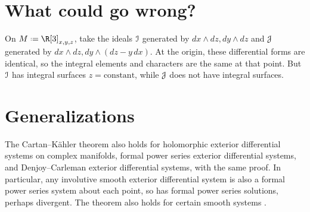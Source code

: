 \section{What could go wrong?}
\begin{example}
On \(M\defeq\R[3]_{x,y,z}\), take the ideals \(\mathcal{I}\) generated by \(dx\wedge dz, dy\wedge dz\) and \(\mathcal{J}\) generated by \(dx\wedge dz, dy\wedge(dz-y \, dx)\).
At the origin, these differential forms are identical, so the integral elements and characters are the same at that point.
But \(\mathcal{I}\) has integral surfaces \(z=\text{constant}\), while \(\mathcal{J}\) does not have integral surfaces.
\end{example}

\section{Generalizations}
The Cartan--K\"ahler theorem also holds for holomorphic exterior differential systems on complex manifolds, formal power series exterior differential systems, and Denjoy--Carleman exterior differential systems, with the same proof.
In particular, any involutive smooth exterior differential system is also a formal power series system about each point, so has formal power series solutions,  perhaps divergent.
The theorem also holds for certain smooth systems \cite{Kakie:1989,Kakie:2008,Yang:1987}.
